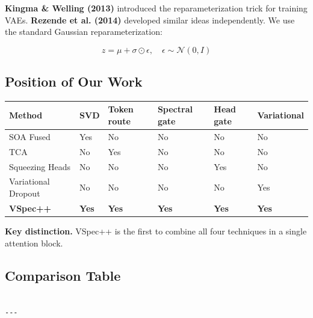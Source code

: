 \textbf{Kingma \& Welling (2013)} introduced the reparameterization trick for 
training VAEs. \textbf{Rezende et al. (2014)} developed similar ideas 
independently. We use the standard Gaussian reparameterization:

\[
z = \mu + \sigma \odot \epsilon, \quad \epsilon \sim \mathcal{N}(0, I)
\tag{2.1}
\]

\subsection{Position of Our Work}

\begin{table}[H]
\centering
\small
\begin{tabular}{llllll}
\toprule
\textbf{Method} & \textbf{SVD} & \textbf{Token route} & \textbf{Spectral gate} & \textbf{Head gate} & \textbf{Variational} \\
\midrule
SOA Fused & Yes & No & No & No & No \\
TCA & No & Yes & No & No & No \\
Squeezing Heads & No & No & No & Yes & No \\
Variational Dropout & No & No & No & No & Yes \\
\textbf{VSpec++} & \textbf{Yes} & \textbf{Yes} & \textbf{Yes} & \textbf{Yes} & \textbf{Yes} \\
\bottomrule
\end{tabular}
\end{table}

\textbf{Key distinction.} VSpec++ is the first to combine all four techniques 
in a single attention block.



\subsection{Comparison Table}

\begin{lstlisting}

---
\end{lstlisting}
